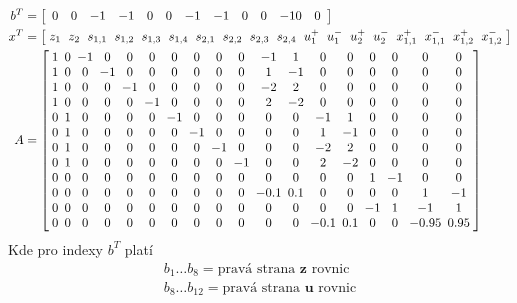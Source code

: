 \documentclass[12pt]{article}
\begin{document}
    \begin{align*}
        b^T &= \left[
        \begin{array}{*{18}{c}}
            0 & 0 & -1 & -1 & 0 & 0 & -1 & -1 & 0 & 0 & -10 & 0
        \end{array}
        \right] \\
        x^T &= \left[\setlength\arraycolsep{3pt}
        \begin{array}{*{18}{c}}
            z_1 &z_2 &s_{1,1} &s_{1,2} &s_{1,3} &s_{1,4} &s_{2,1} &s_{2,2} &s_{2,3} &s_{2,4} &u_{1}^+ &u_{1}^-
            &u_{2}^+ &u_{2}^- &x_{1,1}^+ &x_{1,1}^- &x_{1,2}^+ &x_{1,2}^-
        \end{array}
        \right] \\
        A &=
        \left[ \setlength\arraycolsep{2.5pt}
        \begin{array}{*{18}{c}}
            1 &0 &-1 &0 &0 &0 &0 &0 &0 &0 &-1 &1 &0 &0 &0 &0 &0 &0\\
            1 &0 &0 &-1 &0 &0 &0 &0 &0 &0 &1 &-1 &0 &0 &0 &0 &0 &0\\
            1 &0 &0 &0 &-1 &0 &0 &0 &0 &0 &-2 &2 &0 &0 &0 &0 &0 &0\\
            1 &0 &0 &0 &0 &-1 &0 &0 &0 &0 &2 &-2 &0 &0 &0 &0 &0 &0\\
            0 &1 &0 &0 &0 &0 &-1 &0 &0 &0 &0 &0 &-1 &1 &0 &0 &0 &0\\
            0 &1 &0 &0 &0 &0 &0 &-1 &0 &0 &0 &0 &1 &-1 &0 &0 &0 &0\\
            0 &1 &0 &0 &0 &0 &0 &0 &-1 &0 &0 &0 &-2 &2 &0 &0 &0 &0\\
            0 &1 &0 &0 &0 &0 &0 &0 &0 &-1 &0 &0 &2 &-2 &0 &0 &0 &0\\
            0 &0 &0 &0 &0 &0 &0 &0 &0 &0 &0 &0 &0 &0 &1 &-1 &0 &0\\
            0 &0 &0 &0 &0 &0 &0 &0 &0 &0 &-0.1 &0.1 &0 &0 &0 &0 &1 &-1\\
            0 &0 &0 &0 &0 &0 &0 &0 &0 &0 &0 &0 &0 &0 &-1 &1 &-1 &1\\
            0 &0 &0 &0 &0 &0 &0 &0 &0 &0 &0 &0 &-0.1 &0.1 &0 &0 &-0.95 &0.95
        \end{array}
        \right]
    \end{align*}
    Kde pro indexy $b^T$ platí
    \begin{align*}
        b_{1} \dots b_{8} = \text{pravá strana } \mathbf{z} \text{ rovnic} \\
        b_{8} \dots b_{12} = \text{pravá strana } \mathbf{u} \text{ rovnic} \\
    \end{align*}
\end{document}
